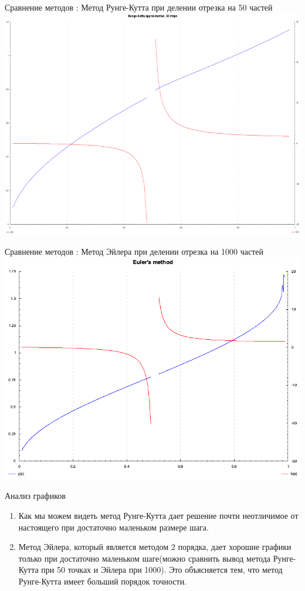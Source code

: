 \documentclass{beamer}
\begin{document}
\begin{frame}{Сравнение методов : Метод Рунге-Кутта при делении отрезка на 50 частей}
	\includegraphics[scale=0.38]{runge50}
\end{frame}

\begin{frame}{Сравнение методов : Метод Эйлера при делении отрезка на 1000 частей}
    \includegraphics[scale=0.38]{euler}
\end{frame}

\begin{frame}{Анализ графиков}
    \begin{enumerate} 
        \item Как мы можем видеть метод Рунге-Кутта дает решение почти неотличимое от настоящего при достаточно маленьком размере шага.
        \item Метод Эйлера, который является методом 2 порядка, дает хорошие графики только при достаточно маленьком шаге(можно сравнить вывод метода Рунге-Кутта при 50 точках и Эйлера при 1000). Это объясняется тем, что метод Рунге-Кутта имеет больший порядок точности.
    \end{enumerate}
\end{frame}
\end{document}
